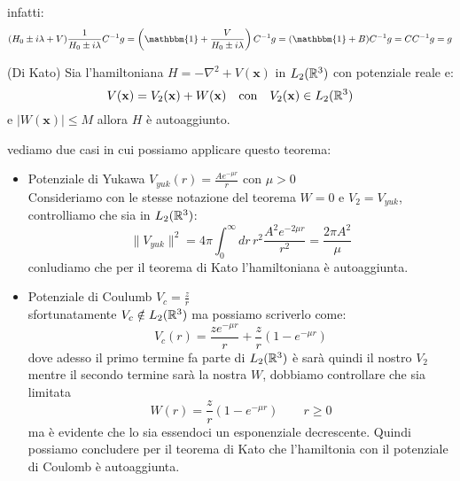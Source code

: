 infatti:
\[(H_0 \pm i\lambda +V)\frac{1}{H_0 \pm i\lambda} C^{-1}g = \left(\mathbbm{1}+\frac{V}{H_0 \pm i\lambda}\right)C^{-1}g = (\mathbbm{1} + B)C^{-1}g = CC^{-1}g=g\]
\begin{thm}(Di Kato)
Sia l'hamiltoniana $H=-\nabla^2 + V(\mathbf{x})$ in $L_2(\mathbb{R}^3)$ con potenziale reale e:
\[V(\mathbf{x}) = V_2(\mathbf{x}) + W(\mathbf{x})\quad\text{con}\quad V_2(\mathbf{x})\in L_2(\mathbb{R}^3)\]
e $|W(\mathbf{x})|\leq M$ allora $H$ è autoaggiunto.
\end{thm}
vediamo due casi in cui possiamo applicare questo teorema:
\begin{itemize}
\item Potenziale di Yukawa $V_{yuk}(r) = \frac{Ae^{-\mu r}}{r}$ con $\mu>0$\\
Consideriamo con le stesse notazione del teorema $W = 0$ e $V_2 = V_{yuk}$, controlliamo che sia in $L_2(\mathbb{R}^3)$:
\[\|V_{yuk}\|^2 = 4\pi\int_0^\infty dr\, r^2\frac{A^2e^{-2\mu r}}{r^2} = \frac{2\pi A^2}{\mu}\]
conludiamo che per il teorema di Kato l'hamiltoniana è autoaggiunta.
\item Potenziale di Coulumb $V_c = \frac{z}{r}$\\
sfortunatamente $V_c\notin L_2(\mathbb{R}^3)$ ma possiamo scriverlo come:
\[V_c(r) = \frac{ze^{-\mu r}}{r} + \frac{z}{r}(1-e^{-\mu r})\] 
dove adesso il primo termine fa parte di $L_2(\mathbb{R}^3)$ è sarà quindi il nostro $V_2$ mentre il secondo termine sarà la nostra $W$, dobbiamo controllare che sia limitata
\[W(r) = \frac{z}{r}(1-e^{-\mu r}) \qquad r\geq 0 \]
ma è evidente che lo sia essendoci un esponenziale decrescente. Quindi possiamo concludere per il teorema di Kato che l'hamiltonia con il potenziale di Coulomb è autoaggiunta.
\end{itemize}
